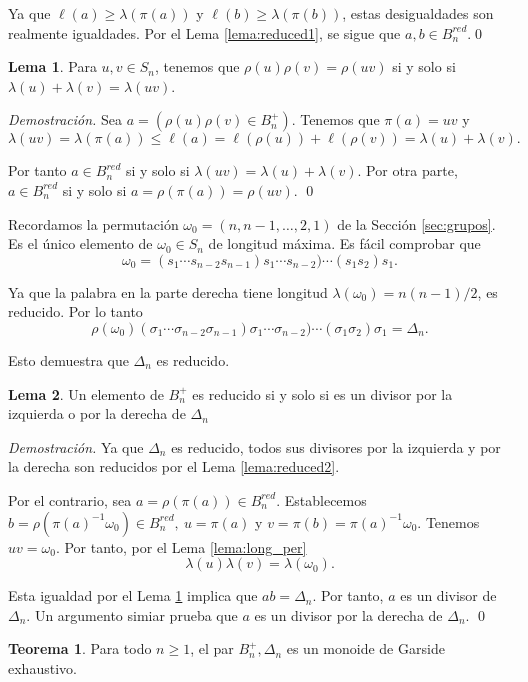 \documentclass[12pt]{article}
\theoremstyle{definition}
\newtheorem{teor}{Teorema}[section]
\newtheorem{lema}{Lema}[section]
\begin{document}
Ya que $\ell(a)\geq \lambda(\pi(a))$ y $\ell(b)\geq \lambda(\pi(b))$, estas desigualdades son realmente igualdades. Por el Lema \ref{lema:reduced1}, se sigue que $a,b\in B_n^{red}$.\qed

\begin{lema}
Para $u,v\in S_n$, tenemos que $\rho(u)\rho(v)=\rho(uv)$ si y solo si $\lambda(u)+\lambda(v)=\lambda(uv)$.
\label{lema:longi}
\end{lema}

\textit{Demostración.} Sea $a=(\rho(u)\rho(v)\in B_n^+)$. Tenemos que $\pi(a)= uv$ y 
$$\lambda(uv)=\lambda(\pi(a))\leq\ell(a)=\ell(\rho(u))+\ell(\rho(v))=\lambda(u)+\lambda(v).$$

Por tanto $a\in B_n^{red}$ si y solo si $\lambda(uv)=\lambda(u)+\lambda(v)$. Por otra parte, $a\in B_n^{red}$ si y solo si $a=\rho(\pi(a))=\rho(uv)$. \qed


Recordamos la permutación $\omega_0=(n,n-1,\ldots,2,1)$ de la Sección \ref{sec:grupos}. Es el único elemento de $\omega_0\in S_n$ de longitud máxima. Es fácil comprobar que
$$\omega_0=(s_1\cdots s_{n-2}s_{n-1})s_1\cdots s_{n-2})\cdots(s_1s_2)s_1.$$

Ya que la palabra en la parte derecha tiene longitud $\lambda(\omega_0)=n(n-1)/2$, es reducido. Por lo tanto
$$\rho(\omega_0)(\sigma_1\cdots \sigma_{n-2}\sigma_{n-1})\sigma_1\cdots \sigma_{n-2})\cdots(\sigma_1\sigma_2)\sigma_1=\Delta_n.$$

Esto demuestra que $\Delta_n$ es reducido.

\begin{lema}
Un elemento de $B_n^+$ es reducido si y solo si es un divisor por la izquierda o por la derecha de $\Delta_n$
\label{lema:reduced3}
\end{lema}

\textit{Demostración.} Ya que $\Delta_n$ es reducido, todos sus divisores por la izquierda y por la derecha son reducidos por el Lema \ref{lema:reduced2}.

Por el contrario, sea $a=\rho(\pi(a))\in B_n^{red}$. Establecemos $b=\rho(\pi(a)^{-1}\omega_0)\in B_n^{red},\ u=\pi(a)$ y $v=\pi(b)=\pi(a)^{-1}\omega_0$. Tenemos $uv=\omega_0$. Por tanto, por el Lema \ref{lema:long_per} 
$$\lambda(u)\lambda(v)=\lambda(\omega_0).$$

Esta igualdad por el Lema \ref{lema:longi} implica que $ab=\Delta_n$. Por tanto, $a$ es un divisor de $\Delta_n$. Un argumento simiar prueba que $a$ es un divisor por la derecha de $\Delta_n$. \qed

\begin{teor}
Para todo $n\geq 1$, el par $B_n^+,\Delta_n$ es un monoide de Garside exhaustivo.
\label{teor:trenzas-garside}
\end{teor}
\end{document}
